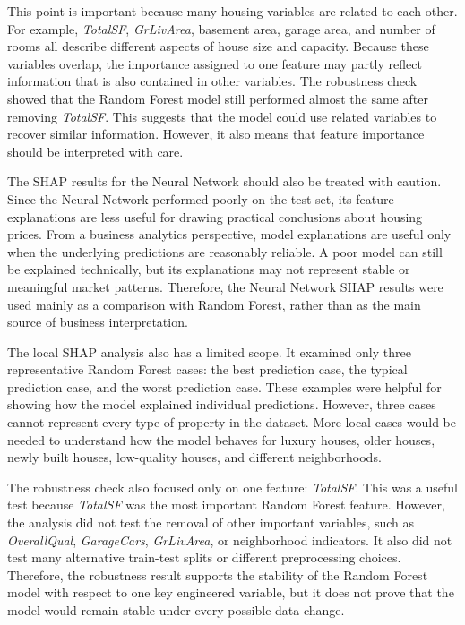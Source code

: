 \documentclass[12pt,a4paper,oneside,openany]{book}
\begin{document}
This point is important because many housing variables are related to each other. For example, \textit{TotalSF}, \textit{GrLivArea}, basement area, garage area, and number of rooms all describe different aspects of house size and capacity. Because these variables overlap, the importance assigned to one feature may partly reflect information that is also contained in other variables. The robustness check showed that the Random Forest model still performed almost the same after removing \textit{TotalSF}. This suggests that the model could use related variables to recover similar information. However, it also means that feature importance should be interpreted with care.

The SHAP results for the Neural Network should also be treated with caution. Since the Neural Network performed poorly on the test set, its feature explanations are less useful for drawing practical conclusions about housing prices. From a business analytics perspective, model explanations are useful only when the underlying predictions are reasonably reliable. A poor model can still be explained technically, but its explanations may not represent stable or meaningful market patterns. Therefore, the Neural Network SHAP results were used mainly as a comparison with Random Forest, rather than as the main source of business interpretation.

The local SHAP analysis also has a limited scope. It examined only three representative Random Forest cases: the best prediction case, the typical prediction case, and the worst prediction case. These examples were helpful for showing how the model explained individual predictions. However, three cases cannot represent every type of property in the dataset. More local cases would be needed to understand how the model behaves for luxury houses, older houses, newly built houses, low-quality houses, and different neighborhoods.

The robustness check also focused only on one feature: \textit{TotalSF}. This was a useful test because \textit{TotalSF} was the most important Random Forest feature. However, the analysis did not test the removal of other important variables, such as \textit{OverallQual}, \textit{GarageCars}, \textit{GrLivArea}, or neighborhood indicators. It also did not test many alternative train-test splits or different preprocessing choices. Therefore, the robustness result supports the stability of the Random Forest model with respect to one key engineered variable, but it does not prove that the model would remain stable under every possible data change.
\end{document}
